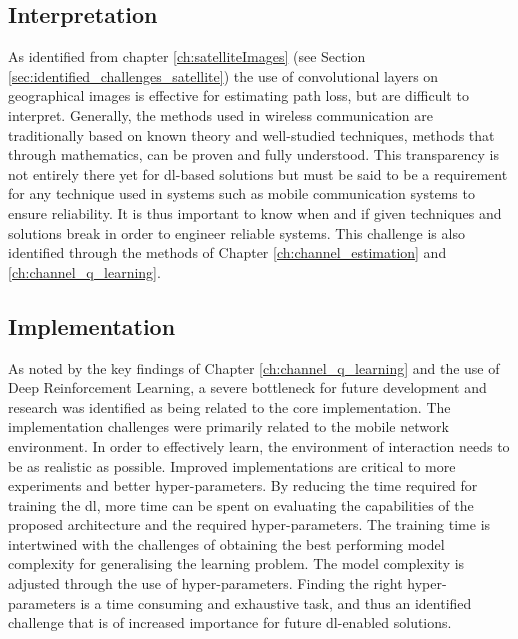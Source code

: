 \subsection{Interpretation}
As identified from chapter \ref{ch:satelliteImages} (see Section \ref{sec:identified_challenges_satellite}) the use of convolutional layers on geographical images is effective for estimating path loss, but are difficult to interpret. Generally, the methods used in wireless communication are traditionally based on known theory and well-studied techniques, methods that through mathematics, can be proven and fully understood. This transparency is not entirely there yet for \gls{dl}-based solutions \cite{Samek2017ExplainableModels} but must be said to be a  requirement for any technique used in systems such as mobile communication systems to ensure reliability. It is thus important to know when and if given techniques and solutions break in order to engineer reliable systems. This challenge is also identified through the methods of Chapter \ref{ch:channel_estimation} and \ref{ch:channel_q_learning}. 

\subsection{Implementation}
As noted by the key findings of Chapter \ref{ch:channel_q_learning} and the use of Deep Reinforcement Learning, a severe bottleneck for future development and research was identified as being related to the core implementation. The implementation challenges were primarily related to the mobile network environment. In order to effectively learn, the environment of interaction needs to be as realistic as possible. Improved implementations are critical to more experiments and better hyper-parameters. By reducing the time required for training the \gls{dl}, more time can be spent on evaluating the capabilities of the proposed architecture and the required hyper-parameters. The training time is intertwined with the challenges of obtaining the best performing model complexity for generalising the learning problem. The model complexity is adjusted through the use of hyper-parameters. Finding the right hyper-parameters is a time consuming and exhaustive task, and thus an identified challenge that is of increased importance for future \gls{dl}-enabled solutions.

